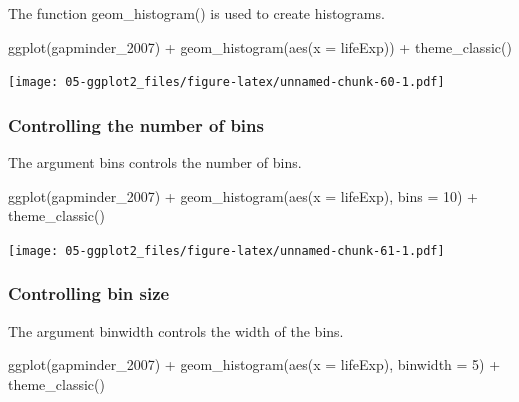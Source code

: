 \documentclass[
]{book}
\newenvironment{Shaded}{\begin{snugshade}}{\end{snugshade}}
\newcommand{\AttributeTok}[1]{\textcolor[rgb]{0.77,0.63,0.00}{#1}}
\newcommand{\DecValTok}[1]{\textcolor[rgb]{0.00,0.00,0.81}{#1}}
\newcommand{\FunctionTok}[1]{\textcolor[rgb]{0.00,0.00,0.00}{#1}}
\newcommand{\NormalTok}[1]{#1}
\newcommand{\SpecialCharTok}[1]{\textcolor[rgb]{0.00,0.00,0.00}{#1}}
\begin{document}
The function geom\_histogram() is used to create histograms.

\begin{Shaded}
\begin{Highlighting}[]
\FunctionTok{ggplot}\NormalTok{(gapminder\_2007) }\SpecialCharTok{+}
   \FunctionTok{geom\_histogram}\NormalTok{(}\FunctionTok{aes}\NormalTok{(}\AttributeTok{x =}\NormalTok{ lifeExp)) }\SpecialCharTok{+}
   \FunctionTok{theme\_classic}\NormalTok{()}
\end{Highlighting}
\end{Shaded}

\texttt{[image: 05-ggplot2\_files/figure-latex/unnamed-chunk-60-1.pdf]}

\hypertarget{controlling-the-number-of-bins}{%
\subsubsection{Controlling the number of bins}\label{controlling-the-number-of-bins}}

The argument bins controls the number of bins.

\begin{Shaded}
\begin{Highlighting}[]
\FunctionTok{ggplot}\NormalTok{(gapminder\_2007) }\SpecialCharTok{+}
   \FunctionTok{geom\_histogram}\NormalTok{(}\FunctionTok{aes}\NormalTok{(}\AttributeTok{x =}\NormalTok{ lifeExp), }\AttributeTok{bins =} \DecValTok{10}\NormalTok{) }\SpecialCharTok{+}
   \FunctionTok{theme\_classic}\NormalTok{()}
\end{Highlighting}
\end{Shaded}

\texttt{[image: 05-ggplot2\_files/figure-latex/unnamed-chunk-61-1.pdf]}

\hypertarget{controlling-bin-size}{%
\subsubsection{Controlling bin size}\label{controlling-bin-size}}

The argument binwidth controls the width of the bins.

\begin{Shaded}
\begin{Highlighting}[]
\FunctionTok{ggplot}\NormalTok{(gapminder\_2007) }\SpecialCharTok{+}
   \FunctionTok{geom\_histogram}\NormalTok{(}\FunctionTok{aes}\NormalTok{(}\AttributeTok{x =}\NormalTok{ lifeExp), }\AttributeTok{binwidth =} \DecValTok{5}\NormalTok{) }\SpecialCharTok{+}
   \FunctionTok{theme\_classic}\NormalTok{()}
\end{Highlighting}
\end{Shaded}
\end{document}
